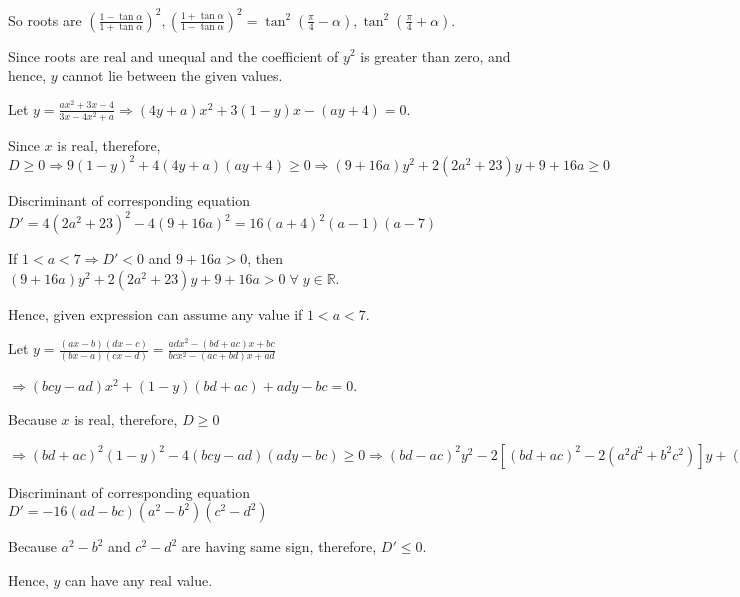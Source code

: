   So roots are $\left(\frac{1 - \tan\alpha}{1 + \tan\alpha}\right)^2, \left(\frac{1 + \tan\alpha}{1 -
    \tan\alpha}\right)^2 = \tan^2\left(\frac{\pi}{4} - \alpha\right), \tan^2\left(\frac{\pi}{4} +
  \alpha\right)$.

  Since roots are real and unequal and the coefficient of $y^2$ is greater than zero, and hence, $y$ cannot
  lie between the given values.
\item Let $y = \frac{ax^2 + 3x - 4}{3x - 4x^2 + a} \Rightarrow (4y + a)x^2 + 3(1 - y)x - (ay + 4) = 0$.

  Since $x$ is real, therefore, $D\geq 0 \Rightarrow 9(1 - y)^2 + 4(4y + a)(ay + 4)\geq 0 \Rightarrow (9 +
  16a)y^2 + 2(2a^2 + 23)y + 9 + 16a\geq 0$

  Discriminant of corresponding equation $D' = 4(2a^2 + 23)^2 - 4(9 + 16a)^2 = 16(a + 4)^2(a - 1)(a - 7)$

  If $1 < a < 7 \Rightarrow D' < 0$ and $9 + 16a > 0$, then $(9 + 16a)y^2 + 2(2a^2 + 23)y + 9 + 16a >
  0\;\forall\;y\in\mathbb{R}$.

  Hence, given expression can assume any value if $1 < a < 7$.
\item Let $y = \frac{(ax - b)(dx - c)}{(bx - a)(cx - d)} = \frac{adx^2 - (bd + ac)x + bc}{bcx^2 - (ac + bd)x
  + ad}$

  $\Rightarrow (bcy - ad)x^2 + (1 - y)(bd + ac) + ady - bc = 0$.

  Because $x$ is real, therefore, $D\geq 0$

  $\Rightarrow (bd + ac)^2(1 - y)^2 - 4(bcy - ad)(ady - bc)\geq 0\Rightarrow (bd - ac)^2y^2 - 2[(bd + ac)^2
    - 2(a^2d^2 + b^2c^2)]y + (bd - ac)^2\geq 0$

  Discriminant of corresponding equation $D' = -16(ad - bc)(a^2 - b^2)(c^2 - d^2)$

  Because $a^2 - b^2$ and $c^2 - d^2$ are having same sign, therefore, $D' \leq 0$.

  Hence, $y$ can have any real value.
\stopitemize
